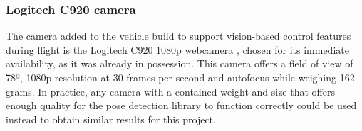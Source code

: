 \subsubsection{Logitech C920 camera}
\label{subsec:camera}

The camera added to the vehicle build to support vision-based control features during flight is the Logitech C920 1080p webcamera \cite{camera-front}, chosen for its immediate availability, as it was already in possession. This camera offers a field of view of 78º, 1080p resolution at 30 frames per second and autofocus while weighing 162 grams. In practice, any camera with a contained weight and size that offers enough quality for the pose detection library to function correctly could be used instead to obtain similar results for this project.